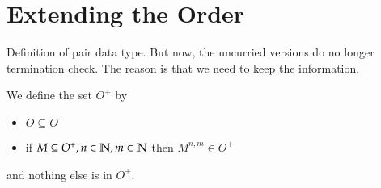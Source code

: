 \section{Extending the Order}
Definition of pair data type.
But now, the uncurried versions do no longer termination check.
The reason is that we need to keep the information.

\newcommand{\coll}{\mathrm{collapse}\:}

\begin{definition}
We define the set $O^{+}$ by   
\begin{itemize}
\item
$ O \subseteq O^{+}$
\item
if $ M \subseteq O^{+} , n \in \mathbb{N} , m \in \mathbb{N} $ then $M^{n,m} \in O^{+}$
\end{itemize}
and nothing else is in $O^{+}$.
\end{definition}

